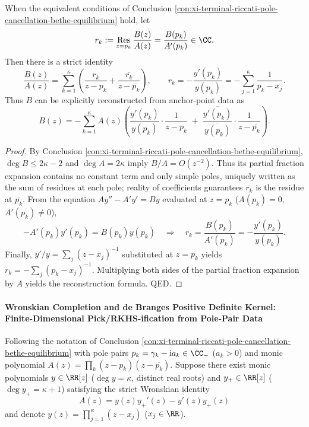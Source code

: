 \begin{conclusion}\label{con:xi-terminal-van-vleck-ratio-residue-partial-fraction-reconstruction}
When the equivalent conditions of Conclusion \ref{con:xi-terminal-riccati-pole-cancellation-bethe-equilibrium} hold, let
\[
r_k:=\operatorname*{Res}_{z=p_k}\frac{B(z)}{A(z)}=\frac{B(p_k)}{A'(p_k)}\in\CC.
\]
Then there is a strict identity
\[
\frac{B(z)}{A(z)}=\sum_{k=1}^{\kappa}\left(\frac{r_k}{z-p_k}+\frac{\overline{r_k}}{z-\overline{p_k}}\right),
\qquad
r_k=-\frac{y'(p_k)}{y(p_k)}=-\sum_{j=1}^{\kappa}\frac{1}{p_k-x_j}.
\]
Thus \(B\) can be explicitly reconstructed from anchor-point data as
\[
B(z)=
-\sum_{k=1}^{\kappa}A(z)\left(
\frac{y'(p_k)}{y(p_k)}\cdot\frac{1}{z-p_k}
\;+\;
\frac{\overline{y'(p_k)}}{\overline{y(p_k)}}\cdot\frac{1}{z-\overline{p_k}}
\right).
\]
\end{conclusion}
\begin{proof}[Proof]
By Conclusion \ref{con:xi-terminal-riccati-pole-cancellation-bethe-equilibrium}, \(\deg B\le 2\kappa-2\) and \(\deg A=2\kappa\) imply \(B/A=O(z^{-2})\).
Thus its partial fraction expansion contains no constant term and only simple poles, uniquely written as the sum of residues at each pole; reality of coefficients guarantees \(\overline{r_k}\) is the residue at \(\overline{p_k}\).
From the equation \(Ay''-A'y'=By\) evaluated at \(z=p_k\) (\(A(p_k)=0\), \(A'(p_k)\neq 0\)),
\[
-A'(p_k)y'(p_k)=B(p_k)y(p_k)\quad\Longrightarrow\quad r_k=\frac{B(p_k)}{A'(p_k)}=-\frac{y'(p_k)}{y(p_k)}.
\]
Finally, \(y'/y=\sum_j(z-x_j)^{-1}\) substituted at \(z=p_k\) yields \(r_k=-\sum_j(p_k-x_j)^{-1}\).
Multiplying both sides of the partial fraction expansion by \(A\) yields the reconstruction formula. QED.
\end{proof}


\paragraph{Wronskian Completion and de Branges Positive Definite Kernel: Finite-Dimensional Pick/RKHS-ification from Pole-Pair Data}
Following the notation of Conclusion \ref{con:xi-terminal-riccati-pole-cancellation-bethe-equilibrium} with pole pairs \(p_k=\gamma_k-\mathrm{i}a_k\in\CC_{-}\) (\(a_k>0\)) and monic polynomial \(A(z)=\prod_k(z-p_k)(z-\overline{p_k})\).
Suppose there exist monic polynomials \(y\in\RR[z]\) (\(\deg y=\kappa\), distinct real roots) and \(y_{+}\in\RR[z]\) (\(\deg y_{+}=\kappa+1\)) satisfying the strict Wronskian identity
\[
\boxed{\;A(z)=y(z)y_{+}'(z)-y'(z)y_{+}(z)\;}
\]
and denote \(y(z)=\prod_{j=1}^{\kappa}(z-x_j)\) (\(x_j\in\RR\)).

